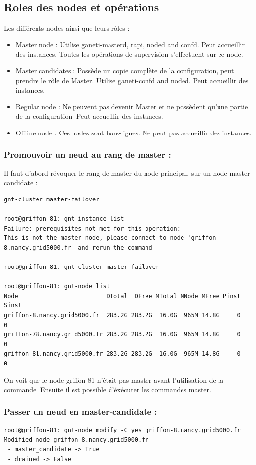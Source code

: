 \subsection {Roles des nodes et opérations}
Les différents nodes ainsi que leurs rôles :
\begin{itemize}
\item Master node : Utilise ganeti-masterd, rapi, noded and confd. Peut accueillir des instances. Toutes les opérations de supervision s'effectuent sur ce node.
\item Master candidates : Possède un copie complète de la configuration, peut prendre le rôle de Master. Utilise ganeti-confd and noded. Peut accueillir des instances.
\item Regular node : Ne peuvent pas devenir Master et ne possèdent qu'une partie de la configuration. Peut accueillir des instances.
\item Offline node : Ces nodes sont hors-lignes. Ne peut pas accueillir des instances.
\end{itemize}
\subsubsection {Promouvoir un neud au rang de master :}

Il faut d'abord révoquer le rang de master du node principal, sur un node master-candidate :
\begin{lstlisting}
gnt-cluster master-failover

root@griffon-81: gnt-instance list
Failure: prerequisites not met for this operation:
This is not the master node, please connect to node 'griffon-8.nancy.grid5000.fr' and rerun the command

root@griffon-81: gnt-cluster master-failover

root@griffon-81: gnt-node list
Node                         DTotal  DFree MTotal MNode MFree Pinst Sinst
griffon-8.nancy.grid5000.fr  283.2G 283.2G  16.0G  965M 14.8G     0     0
griffon-78.nancy.grid5000.fr 283.2G 283.2G  16.0G  965M 14.8G     0     0
griffon-81.nancy.grid5000.fr 283.2G 283.2G  16.0G  965M 14.8G     0     0
\end{lstlisting}
On voit que le node griffon-81 n'était pas master avant l'utilisation de la commande. Ensuite il est possible d'éxécuter les commandes master.

\subsubsection {Passer un neud en master-candidate :}
\begin{lstlisting}
root@griffon-81: gnt-node modify -C yes griffon-8.nancy.grid5000.fr
Modified node griffon-8.nancy.grid5000.fr
 - master_candidate -> True
 - drained -> False
\end{lstlisting}
